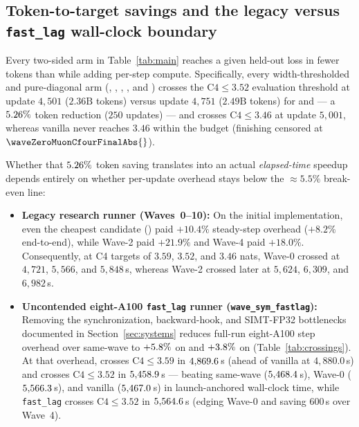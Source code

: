 \subsection{Token-to-target savings and the legacy versus \texttt{fast\_lag} wall-clock boundary}
\label{sec:cost}

Every two-sided arm in Table~\ref{tab:main} reaches a given held-out loss in
fewer tokens than  while adding per-step compute. Specifically,
every width-thresholded and pure-diagonal arm (,
, , , and )
crosses the $\text{C4}\le 3.52$ evaluation threshold at update $4{,}501$
($2.36\text{B}$ tokens) versus update $4{,}751$ ($2.49\text{B}$ tokens) for
 and  --- a $5.26\%$ token reduction
($250$ updates) --- and crosses $\text{C4}\le 3.46$ at update $5{,}001$, whereas
vanilla  never reaches $3.46$ within the budget (finishing censored
at $\waveZeroMuonCfourFinalAbs{}$).

Whether that $5.26\%$ token saving translates into an actual
\emph{elapsed-time} speedup depends entirely on whether per-update overhead stays
below the $\approx 5.5\%$ break-even line:
\begin{itemize}
\item \textbf{Legacy research runner (Waves~0--10):} On the initial
  implementation, even the cheapest candidate () paid $+10.4\%$
  steady-step overhead ($+8.2\%$ end-to-end), while Wave-2  paid
  $+21.9\%$ and Wave-4  paid $+18.0\%$. Consequently, at C4
  targets of $3.59$, $3.52$, and $3.46$ nats, Wave-0  crossed at
  $4{,}721$, $5{,}566$, and $5{,}848$\,s, whereas Wave-2  crossed
  later at $5{,}624$, $6{,}309$, and $6{,}982$\,s.
\item \textbf{Uncontended eight-A100 \texttt{fast\_lag} runner
  (\texttt{wave\_sym\_fastlag}):} Removing the synchronization, backward-hook,
  and SIMT-FP32 bottlenecks documented in Section~\ref{sec:systems} reduces
  full-run eight-A100 step overhead over same-wave  to
  $+5.8\%$ on  and
  $+3.8\%$ on  (Table~\ref{tab:crossings}).
  At that overhead,  crosses $\text{C4}\le 3.59$ in
  $4{,}869.6$\,s (ahead of vanilla  at
  $4{,}880.0$\,s) and crosses $\text{C4}\le 3.52$ in
  $5{,}458.9$\,s --- beating same-wave 
  ($5{,}468.4$\,s), Wave-0 
  ($5{,}566.3$\,s), and vanilla 
  ($5{,}467.0$\,s) in launch-anchored wall-clock time,
  while \texttt{fast\_lag}  crosses $\text{C4}\le 3.52$ in
  $5{,}564.6$\,s (edging Wave-0  and saving
  $600$\,s over Wave~4).
\end{itemize}

